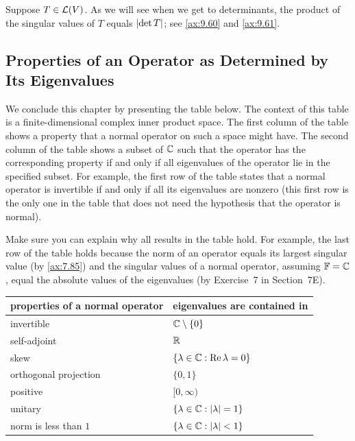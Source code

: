 Suppose $T\in\mathcal{L}(V)$. As we will see when we get to determinants, the product
of the singular values of $T$ equals $\lvert \operatorname{det} T \rvert$; see \ref{ax:9.60} and
\ref{ax:9.61}.

\subsection{Properties of an Operator as Determined by Its Eigenvalues}

We conclude this chapter by presenting the table below. The context of this
table is a finite-dimensional complex inner product space. The first column of
the table shows a property that a normal operator on such a space might have.
The second column of the table shows a subset of $\mathbb{C}$ such that the operator
has the corresponding property if and only if all eigenvalues of the operator
lie in the specified subset. For example, the first row of the table states
that a normal operator is invertible if and only if all its eigenvalues are
nonzero (this first row is the only one in the table that does not need the
hypothesis that the operator is normal).

Make sure you can explain why all results in the table hold. For example, the
last row of the table holds because the norm of an operator equals its largest
singular value (by \ref{ax:7.85}) and the singular values of a normal
operator, assuming $\mathbb{F}=\mathbb{C}$, equal the absolute values of the eigenvalues (by
Exercise~7 in Section~7E).

\begin{center}\small
\begin{tabular}{l|l}
\multicolumn{1}{l}{\textbf{properties of a normal operator}} &
  \multicolumn{1}{l}{\textbf{eigenvalues are contained in}}\\
\hline
invertible & $\mathbb{C}\setminus\{0\}$\\ \hline
self-adjoint & $\mathbb{R}$\\ \hline
skew & $\{\lambda\in\mathbb{C} : \operatorname{Re}\lambda=0\}$\\ \hline
orthogonal projection & $\{0,1\}$\\ \hline
positive & $[0,\infty)$\\ \hline
unitary & $\{\lambda\in\mathbb{C} : \lvert \lambda \rvert=1\}$\\ \hline
norm is less than $1$ & $\{\lambda\in\mathbb{C} : \lvert \lambda \rvert<1\}$\\ \hline
\end{tabular}
\end{center}

